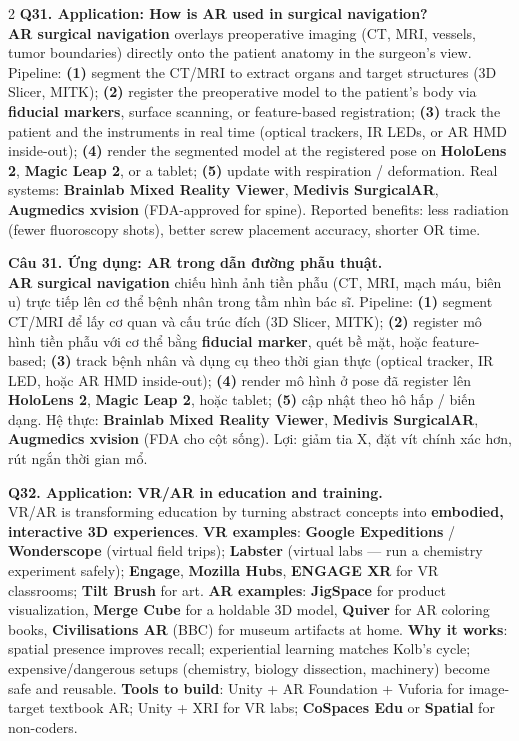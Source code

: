 \begin{paracol}{2}
\textbf{Q31. Application: How is AR used in surgical navigation?}\\
\textbf{AR surgical navigation} overlays preoperative imaging (CT, MRI, vessels, tumor boundaries) directly onto the patient anatomy in the surgeon's view. Pipeline: \textbf{(1)} segment the CT/MRI to extract organs and target structures (3D Slicer, MITK); \textbf{(2)} register the preoperative model to the patient's body via \textbf{fiducial markers}, surface scanning, or feature-based registration; \textbf{(3)} track the patient and the instruments in real time (optical trackers, IR LEDs, or AR HMD inside-out); \textbf{(4)} render the segmented model at the registered pose on \textbf{HoloLens 2}, \textbf{Magic Leap 2}, or a tablet; \textbf{(5)} update with respiration / deformation. Real systems: \textbf{Brainlab Mixed Reality Viewer}, \textbf{Medivis SurgicalAR}, \textbf{Augmedics xvision} (FDA-approved for spine). Reported benefits: less radiation (fewer fluoroscopy shots), better screw placement accuracy, shorter OR time.

\switchcolumn

\textbf{Câu 31. Ứng dụng: AR trong dẫn đường phẫu thuật.}\\
\textbf{AR surgical navigation} chiếu hình ảnh tiền phẫu (CT, MRI, mạch máu, biên u) trực tiếp lên cơ thể bệnh nhân trong tầm nhìn bác sĩ. Pipeline: \textbf{(1)} segment CT/MRI để lấy cơ quan và cấu trúc đích (3D Slicer, MITK); \textbf{(2)} register mô hình tiền phẫu với cơ thể bằng \textbf{fiducial marker}, quét bề mặt, hoặc feature-based; \textbf{(3)} track bệnh nhân và dụng cụ theo thời gian thực (optical tracker, IR LED, hoặc AR HMD inside-out); \textbf{(4)} render mô hình ở pose đã register lên \textbf{HoloLens 2}, \textbf{Magic Leap 2}, hoặc tablet; \textbf{(5)} cập nhật theo hô hấp / biến dạng. Hệ thực: \textbf{Brainlab Mixed Reality Viewer}, \textbf{Medivis SurgicalAR}, \textbf{Augmedics xvision} (FDA cho cột sống). Lợi: giảm tia X, đặt vít chính xác hơn, rút ngắn thời gian mổ.

\switchcolumn*

\textbf{Q32. Application: VR/AR in education and training.}\\
VR/AR is transforming education by turning abstract concepts into \textbf{embodied, interactive 3D experiences}. \textbf{VR examples}: \textbf{Google Expeditions} / \textbf{Wonderscope} (virtual field trips); \textbf{Labster} (virtual labs --- run a chemistry experiment safely); \textbf{Engage}, \textbf{Mozilla Hubs}, \textbf{ENGAGE XR} for VR classrooms; \textbf{Tilt Brush} for art. \textbf{AR examples}: \textbf{JigSpace} for product visualization, \textbf{Merge Cube} for a holdable 3D model, \textbf{Quiver} for AR coloring books, \textbf{Civilisations AR} (BBC) for museum artifacts at home. \textbf{Why it works}: spatial presence improves recall; experiential learning matches Kolb's cycle; expensive/dangerous setups (chemistry, biology dissection, machinery) become safe and reusable. \textbf{Tools to build}: Unity + AR Foundation + Vuforia for image-target textbook AR; Unity + XRI for VR labs; \textbf{CoSpaces Edu} or \textbf{Spatial} for non-coders.


\end{paracol}
